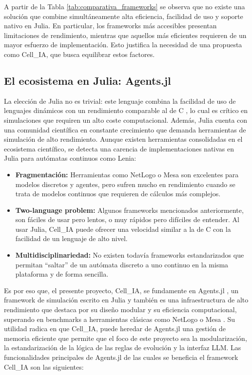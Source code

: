 \documentclass[runningheads]{llncs}
\begin{document}
A partir de la Tabla \ref{tab:comparativa_frameworks} se observa que no existe una solución que combine simultáneamente alta eficiencia, facilidad de uso y soporte nativo en Julia. En particular, los frameworks más accesibles presentan limitaciones de rendimiento, mientras que aquellos más eficientes requieren de un mayor esfuerzo de implementación. Esto justifica la necesidad de una propuesta como Cell\_IA, que busca equilibrar estos factores.

\subsection{El ecosistema en Julia: Agents.jl}
La elección de Julia no es trivial: este lenguaje combina la facilidad de uso de lenguajes dinámicos con un rendimiento comparable al de C \cite{ref_julia}, lo cual es crítico en simulaciones que requiren un alto coste computacional. Además, Julia cuenta con una comunidad científica en constante crecimiento que demanda herramientas de simulación de alto rendimiento. Aunque existen herramientas consolidadas en el ecosistema científico, se detecta una carencia de implementaciones nativas en Julia para autómatas continuos como Lenia:

\begin{itemize}
    \item \textbf{Fragmentación: } Herramientas como NetLogo \cite{ref_netlogo} o Mesa \cite{ref_mesa} son excelentes para modelos discretos y agentes, pero sufren mucho en rendimiento cuando se trata de modelos continuos que requieren de cálculos más complejos.
    \item \textbf{Two-language problem:} Algunos frameworks mencionados anteriormente, son fáciles de usar pero lentos, o muy rápidos pero difíciles de entender. Al usar Julia, Cell\_IA puede ofrecer una velocidad similar a la de C con la facilidad de un lenguaje de alto nivel.
    \item \textbf{Multidisciplinariedad:} No existen todavía frameworks estandarizados que permitan ``saltar'' de un autómata discreto a uno continuo en la misma plataforma y de forma sencilla.
\end{itemize}

Es por eso que, el presente proyecto, Cell\_IA, se fundamente en Agents.jl \cite{ref_agentsjl}, un framework de simulación escrito en Julia y también es una infraestructura de alto rendimiento que destaca por su diseño modular y su eficiencia computacional, superando en benchmarks a herramientas clásicas como NetLogo o Mesa \cite{ref_agentsjl}. Su utilidad radica en que Cell\_IA, puede heredar de Agents.jl una gestión de memoria eficiente que permite que el foco de este proyecto sea la modularización, la estandarización de la lógica de las reglas de evolución y la interfaz LLM. Las funcionalidades principales de Agents.jl de las cuales se beneficia el framework Cell\_IA son las siguientes:
\end{document}
